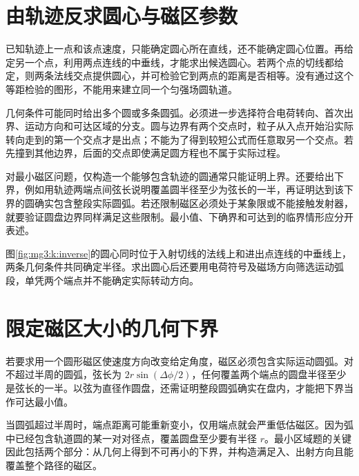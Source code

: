 \section{由轨迹反求圆心与磁区参数}
已知轨迹上一点和该点速度，只能确定圆心所在直线，还不能确定圆心位置。再给定另一个点，利用两点连线的中垂线，才能求出候选圆心。若两个点的切线都给定，则两条法线交点提供圆心，并可检验它到两点的距离是否相等。没有通过这个等距检验的图形，不能用来建立同一个匀强场圆轨道。


几何条件可能同时给出多个圆或多条圆弧。必须进一步选择符合电荷转向、首次出界、运动方向和可达区域的分支。圆与边界有两个交点时，粒子从入点开始沿实际转向走到的第一个交点才是出点；不能为了得到较短公式而任意取另一个交点。若先撞到其他边界，后面的交点即使满足圆方程也不属于实际过程。


对最小磁区问题，仅构造一个能够包含轨迹的圆通常只能证明上界。还要给出下界，例如用轨迹两端点间弦长说明覆盖圆半径至少为弦长的一半，再证明达到该下界的圆确实包含整段实际圆弧。若还限制磁区必须处于某象限或不能接触发射器，就要验证圆盘边界同样满足这些限制。最小值、下确界和可达到的临界情形应分开表述。


图\ref{fig:mg3:k:inverse}的圆心同时位于入射切线的法线上和进出点连线的中垂线上，两条几何条件共同确定半径。求出圆心后还要用电荷符号及磁场方向筛选运动弧段，单凭两个端点并不能确定实际转动方向。


\section{限定磁区大小的几何下界}
若要求用一个圆形磁区使速度方向改变给定角度，磁区必须包含实际运动圆弧。对不超过半周的圆弧，弦长为 $2r\sin(\Delta\phi/2)$，任何覆盖两个端点的圆盘半径至少是弦长的一半。以弦为直径作圆盘，还需证明整段圆弧确实在盘内，才能把下界当作可达最小值。


当圆弧超过半周时，端点距离可能重新变小，仅用端点就会严重低估磁区。因为弧中已经包含轨道圆的某一对对径点，覆盖圆盘至少要有半径 $r$。最小区域题的关键因此包括两个部分：从几何上得到不可再小的下界，并构造满足入、出射方向且能覆盖整个路径的磁区。


